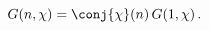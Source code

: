 \[\mathop{G\/}\nolimits\!\left(n,\mathop{\chi\/}\nolimits\right)=\conj{\mathop{%
\chi\/}\nolimits}(n)\mathop{G\/}\nolimits\!\left(1,\mathop{\chi\/}\nolimits%
\right).\]